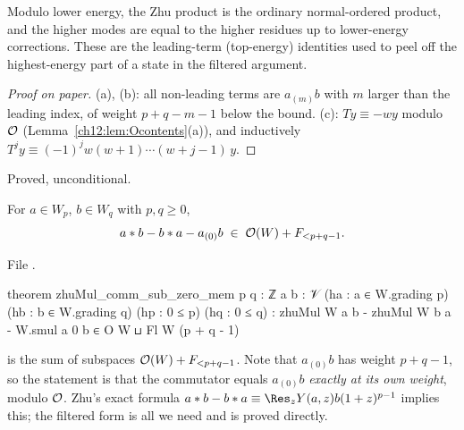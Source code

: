 \begin{physics}
Modulo lower energy, the Zhu product is the ordinary normal-ordered product, and the higher modes are equal to the higher residues up to lower-energy corrections. These are the leading-term (top-energy) identities used to peel off the highest-energy part of a state in the filtered argument.
\end{physics}
\begin{proof}[Proof on paper]
(a), (b): all non-leading terms are $a_{(m)}b$ with $m$ larger than the leading index, of weight
$p+q-m-1$ below the bound.  (c): $Ty\equiv-wy$ modulo $\mathcal{O}$ (Lemma~\ref{ch12:lem:Ocontents}(a)),
and inductively $T^jy\equiv(-1)^j w(w+1)\cdots(w+j-1)\,y$.
\end{proof}
\begin{status}Proved, unconditional.\end{status}

\begin{theorem}\label{ch12:thm:comm}
For $a\in W_p$, $b\in W_q$ with $p,q\ge0$,
\begin{equation*}
  a\ast b - b\ast a - a_{(0)}b \;\in\; \mathcal{O}(W) + F_{<p+q-1}.
\end{equation*}
\end{theorem}
File .
\begin{leancode}
theorem zhuMul_comm_sub_zero_mem {p q : ℤ} {a b : 𝒱} (ha : a ∈ W.grading p)
    (hb : b ∈ W.grading q) (hp : 0 ≤ p) (hq : 0 ≤ q) :
    zhuMul W a b - zhuMul W b a - W.smul a 0 b ∈ O W ⊔ Fl W (p + q - 1)
\end{leancode}
\begin{dictionary}
 is the sum of subspaces $\mathcal{O}(W)+F_{<p+q-1}$.  Note that
$a_{(0)}b$ has weight $p+q-1$, so the statement is that the commutator equals $a_{(0)}b$ \emph{exactly
at its own weight}, modulo $\mathcal{O}$.  Zhu's exact formula $a\ast b-b\ast a\equiv\Res_z
Y(a,z)b(1+z)^{p-1}$ implies this; the filtered form is all we need and is proved directly.
\end{dictionary}

